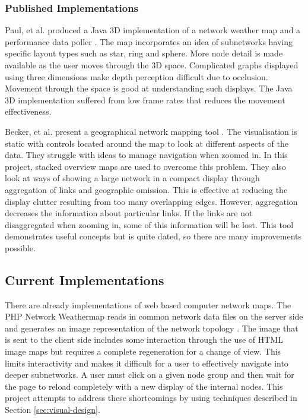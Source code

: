 \documentclass[11pt, a4paper]{article}
\begin{document}
\subsubsection{Published Implementations}
\label{sec:published-implementations}

Paul, et al. produced a Java 3D implementation of a network weather map and a
performance data poller \cite{Paul_2000}. The map incorporates an idea of
subnetworks having specific layout types such as star, ring and sphere. More
node detail is made available as the user moves through the 3D space.
Complicated graphs displayed using three dimensions make depth perception
difficult due to occlusion. Movement through the space is good at understanding
such displays. The Java 3D implementation suffered from low frame rates that
reduces the movement effectiveness.


Becker, et al. present a geographical network mapping tool \cite{Becker_1995}.
The visualisation is static with controls located around the map to look at
different aspects of the data. They struggle with ideas to manage navigation
when zoomed in. In this project, stacked overview maps are used to overcome this
problem. They also look at ways of showing a large network in a compact display
through aggregation of links and geographic omission. This is effective at
reducing the display clutter resulting from too many overlapping edges. However,
aggregation decreases the information about particular links. If the links are
not disaggregated when zooming in, some of this information will be lost. This
tool demonstrates useful concepts but is quite dated, so there are many
improvements possible.


\subsection{Current Implementations}
\label{sec:current-implementations}

There are already implementations of web based computer network maps. The PHP
Network Weathermap reads in common network data files on the server side and
generates an image representation of the network topology
\cite{PHP_Network_Weathermap_website}. The image that is sent to the client side
includes some interaction through the use of HTML image maps but requires a
complete regeneration for a change of view. This limits interactivity and makes
it difficult for a user to effectively navigate into deeper subnetworks. A user
must click on a given node group and then wait for the page to reload completely
with a new display of the internal nodes. This project attempts to address
these shortcomings by using techniques described in Section
\ref{sec:visual-design}. 
\end{document}
